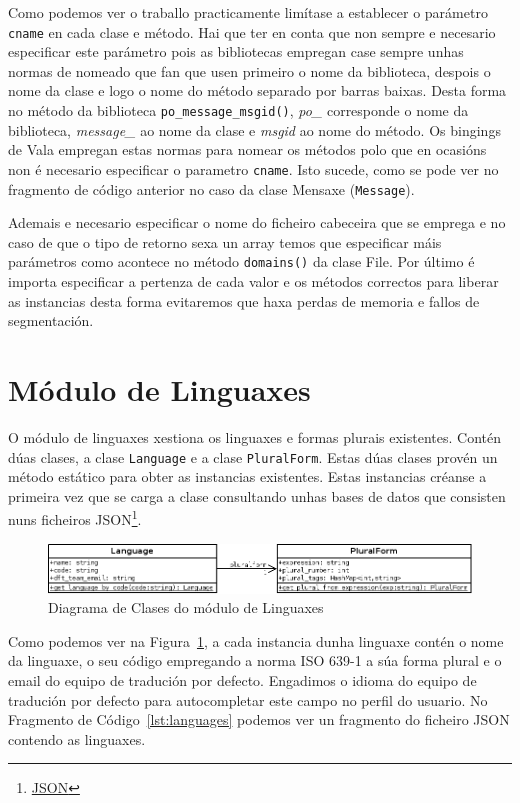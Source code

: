 Como podemos ver o traballo practicamente limítase a establecer o parámetro \lstinline{cname} en cada clase e método. Hai que ter en conta que non sempre e necesario especificar este parámetro pois as bibliotecas empregan case sempre unhas normas de nomeado que fan que usen primeiro o nome da biblioteca, despois o nome da clase e logo o nome do método separado por barras baixas. Desta forma no método da biblioteca \lstinline{po_message_msgid()}, \emph{po\_} corresponde o nome da biblioteca, \emph{message\_} ao nome da clase e \emph{msgid} ao nome do método. Os bingings de Vala empregan estas normas para nomear os métodos polo que en ocasións non é necesario especificar o parametro \lstinline{cname}. Isto sucede, como se pode ver no fragmento de código anterior no caso da clase Mensaxe (\lstinline{Message}).

Ademais e necesario especificar o nome do ficheiro cabeceira que se emprega e no caso de que o tipo de retorno sexa un array temos que especificar máis parámetros como acontece no método \lstinline{domains()} da clase File. Por último é importa especificar a pertenza de cada valor e os métodos correctos para liberar as instancias desta forma evitaremos que haxa perdas de memoria e fallos de segmentación.

\section{Módulo de Linguaxes}
O módulo de linguaxes xestiona os linguaxes e formas plurais existentes. Contén dúas clases, a clase \lstinline{Language} e a clase \lstinline{PluralForm}. Estas dúas clases provén un método estático para obter as instancias existentes. Estas instancias créanse a primeira vez que se carga a clase consultando unhas bases de datos que consisten nuns ficheiros JSON\footnote{\href{http://gl.wikipedia.org/wiki/JSON}{JSON}}.

\begin{figure}[h!]
    \centering
    \includegraphics[width=\textwidth]{img/languages.png}
    \caption{Diagrama de Clases do módulo de Linguaxes}
    \label{fig:dia_class:languages}
\end{figure}

Como podemos ver na Figura~\ref{fig:dia_class:languages}, a cada instancia dunha linguaxe contén o nome da linguaxe, o seu código empregando a norma ISO 639-1 a súa forma plural e o email do equipo de tradución por defecto. Engadimos o idioma do equipo de tradución por defecto para autocompletar este campo no perfil do usuario. No Fragmento de Código~\ref{lst:languages} podemos ver un fragmento do ficheiro JSON contendo as linguaxes.

